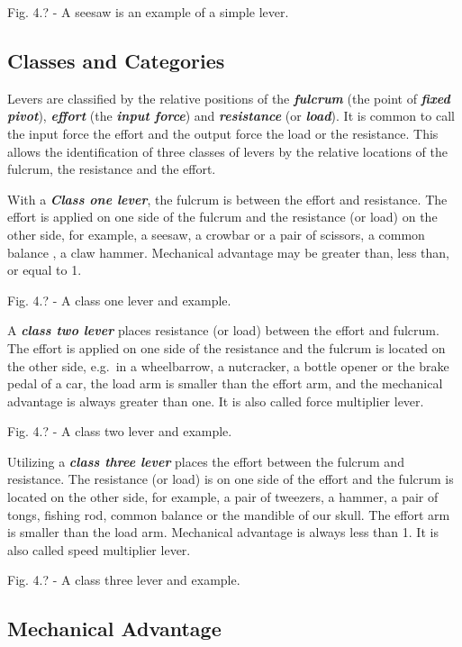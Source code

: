 \documentclass[
]{book}
\begin{document}
Fig. 4.? - A seesaw is an example of a simple lever.

\hypertarget{classes-and-categories}{%
\subsection{Classes and Categories}\label{classes-and-categories}}

Levers are classified by the relative positions of the \textbf{\emph{fulcrum}} (the point of \textbf{\emph{fixed pivot}}), \textbf{\emph{effort}} (the \textbf{\emph{input force}}) and \textbf{\emph{resistance}} (or \textbf{\emph{load}}). It is common to call the input force the effort and the output force the load or the resistance. This allows the identification of three classes of levers by the relative locations of the fulcrum, the resistance and the effort.

With a \textbf{\emph{Class one lever}}, the fulcrum is between the effort and resistance. The effort is applied on one side of the fulcrum and the resistance (or load) on the other side, for example, a seesaw, a crowbar or a pair of scissors, a common balance , a claw hammer. Mechanical advantage may be greater than, less than, or equal to 1.

Fig. 4.? - A class one lever and example.

A \textbf{\emph{class two lever}} places resistance (or load) between the effort and fulcrum. The effort is applied on one side of the resistance and the fulcrum is located on the other side, e.g.~in a wheelbarrow, a nutcracker, a bottle opener or the brake pedal of a car, the load arm is smaller than the effort arm, and the mechanical advantage is always greater than one. It is also called force multiplier lever.

Fig. 4.? - A class two lever and example.

Utilizing a \textbf{\emph{class three lever}} places the effort between the fulcrum and resistance. The resistance (or load) is on one side of the effort and the fulcrum is located on the other side, for example, a pair of tweezers, a hammer, a pair of tongs, fishing rod, common balance or the mandible of our skull. The effort arm is smaller than the load arm. Mechanical advantage is always less than 1. It is also called speed multiplier lever.

Fig. 4.? - A class three lever and example.

\hypertarget{mechanical-advantage}{%
\subsection{Mechanical Advantage}\label{mechanical-advantage}}
\end{document}
